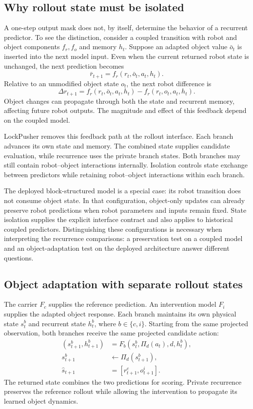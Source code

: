 \documentclass[conference]{IEEEtran}
\begin{document}
\subsection{Why rollout state must be isolated}
A one-step output mask does not, by itself, determine the behavior of a recurrent predictor. To see the distinction, consider a coupled transition with robot and object components $f_r,f_o$ and memory $h_t$. Suppose an adapted object value $\bar o_t$ is inserted into the next model input. Even when the current returned robot state is unchanged, the next prediction becomes
\begin{equation}
\bar r_{t+1}=f_r(r_t,\bar o_t,a_t,h_t).
\end{equation}
Relative to an unmodified object state $o_t$, the next robot difference is
\begin{equation}
\Delta r_{t+1}=f_r(r_t,\bar o_t,a_t,h_t)
-f_r(r_t,o_t,a_t,h_t).
\end{equation}
Object changes can propagate through both the state and recurrent memory, affecting future robot outputs. The magnitude and effect of this feedback depend on the coupled model.

LockPusher removes this feedback path at the rollout interface. Each branch advances its own state and memory. The combined state supplies candidate evaluation, while recurrence uses the private branch states. Both branches may still contain robot--object interactions internally. Isolation controls state exchange between predictors while retaining robot--object interactions within each branch.

The deployed block-structured model is a special case: its robot transition does not consume object state. In that configuration, object-only updates can already preserve robot predictions when robot parameters and inputs remain fixed. State isolation supplies the explicit interface contract and also applies to historical coupled predictors. Distinguishing these configurations is necessary when interpreting the recurrence comparisons: a preservation test on a coupled model and an object-adaptation test on the deployed architecture answer different questions.

\subsection{Object adaptation with separate rollout states}
The carrier $F_c$ supplies the reference prediction. An intervention model $F_i$ supplies the adapted object response. Each branch maintains its own physical state $s^b_t$ and recurrent state $h^b_t$, where $b\in\{c,i\}$. Starting from the same projected observation, both branches receive the same projected candidate action:
\begin{align}
(s^b_{t+1},h^b_{t+1})&=F_b(s^b_t,\Pi_d(a_t),d,h^b_t),\\
s^b_{t+1}&\leftarrow\Pi_d(s^b_{t+1}),\\
\hat s_{t+1}&=[r^c_{t+1},o^i_{t+1}].\label{eq:publish}
\end{align}
The returned state combines the two predictions for scoring. Private recurrence preserves the reference rollout while allowing the intervention to propagate its learned object dynamics.
\end{document}
